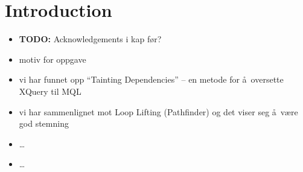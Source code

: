 \chapter{Introduction}
\label{chapter:introduction}
\begin{itemize}
  \item \textbf{\LARGE TODO:} Acknowledgements i kap f\o r?
  \item motiv for oppgave
  \item vi har funnet opp ``Tainting Dependencies'' -- en metode for \aa~oversette XQuery til MQL
  \item vi har sammenlignet mot Loop Lifting (Pathfinder) og det viser seg \aa~v\ae re god stemning
  \item \ldots
  \item \ldots 
\end{itemize}
